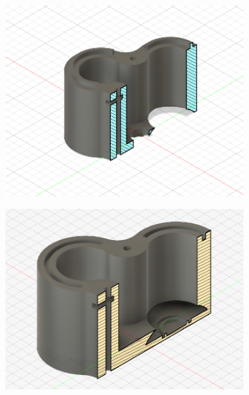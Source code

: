 \documentclass[twoside]{article}
\begin{document}
\begin{figure}[H]
	\centering
	\begin{subfigure}[b]{0.33\linewidth}
		\centering
		\includegraphics[width=\textwidth]{top_v1}
	\end{subfigure}%
	\begin{subfigure}[b]{0.33\linewidth}
		\centering		
		\includegraphics[width=\textwidth]{bottom_v1}
	\end{subfigure}%
	\begin{subfigure}[b]{0.33\linewidth}
		\centering

\end{subfigure}
\end{figure}
\end{document}
